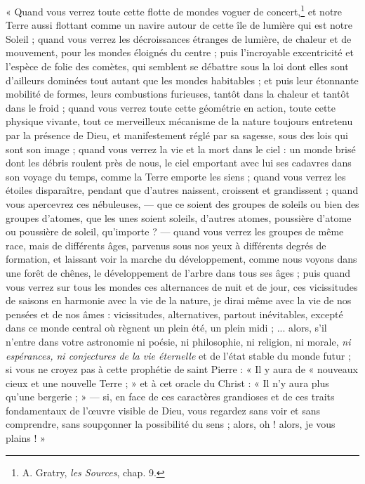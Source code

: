 \documentclass[a4paper, 11pt, oneside, landscape]{article}
\begin{document}
« Quand vous verrez toute cette flotte de mondes voguer de concert,\footnote{A. Gratry, \emph{les Sources}, chap. 9.} et notre Terre aussi flottant comme un navire autour de cette île de lumière qui est notre Soleil ; quand vous verrez les décroissances étranges de lumière, de chaleur et de mouvement, pour les mondes éloignés du centre ; puis l'incroyable excentricité et l'espèce de folie des comètes, qui semblent se débattre sous la loi dont elles sont d'ailleurs dominées tout autant que les mondes habitables ; et puis leur étonnante mobilité de formes, leurs combustions furieuses, tantôt dans la chaleur et tantôt dans le froid ; quand vous verrez toute cette géométrie en action, toute cette physique vivante, tout ce merveilleux mécanisme de la nature toujours entretenu par la présence de Dieu, et manifestement réglé par sa sagesse, sous des lois qui sont son image ; quand vous verrez la vie et la mort dans le ciel : un monde brisé dont les débris roulent près de nous, le ciel emportant avec lui ses cadavres dans son voyage du temps, comme la Terre emporte les siens ; quand vous verrez les étoiles disparaître, pendant que d'autres naissent, croissent et grandissent ; quand vous apercevrez ces nébuleuses, --- que ce soient des groupes de soleils ou bien des groupes d'atomes, que les unes soient soleils, d'autres atomes, poussière d'atome ou poussière de soleil, qu'importe ? --- quand vous verrez les groupes de même race, mais de différents âges, parvenus sous nos yeux à différents degrés de formation, et laissant voir la marche du développement, comme nous voyons dans une forêt de chênes, le développement de l'arbre dans tous ses âges ; puis quand vous verrez sur tous les mondes ces alternances de nuit et de jour, ces vicissitudes de saisons en harmonie avec la vie de la nature, je dirai même avec la vie de nos pensées et de nos âmes : vicissitudes, alternatives, partout inévitables, excepté dans ce monde central où règnent un plein été, un plein midi ; ... alors, s'il n'entre dans votre astronomie ni poésie, ni philosophie, ni religion, ni morale, \emph{ni espérances, ni conjectures de la vie éternelle} et de l'état stable du monde futur ; si vous ne croyez pas à cette prophétie de saint Pierre : « Il y aura de « nouveaux cieux et une nouvelle Terre ; » et à cet oracle du Christ : « Il n'y aura plus qu'une bergerie ; » --- si, en face de ces caractères grandioses et de ces traits fondamentaux de l'œuvre visible de Dieu, vous regardez sans voir et sans comprendre, sans soupçonner la possibilité du sens ; alors, oh ! alors, je vous plains ! »
\end{document}
